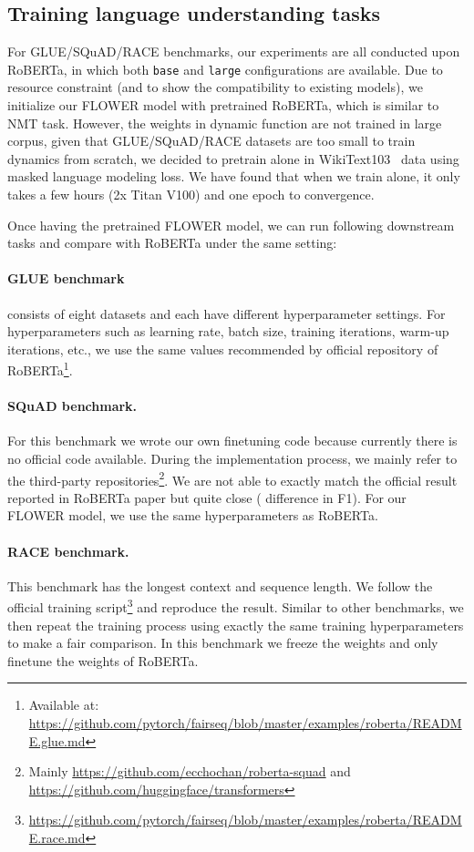 \documentclass[11pt]{article}
\begin{document}
\subsection{Training language understanding tasks}
For GLUE/SQuAD/RACE benchmarks, our experiments are all conducted upon RoBERTa, in which both \texttt{base} and \texttt{large} configurations are available. Due to resource constraint (and to show the compatibility to existing models), we initialize our FLOWER model with pretrained RoBERTa, which is similar to NMT task. However, the weights  in dynamic function  are not trained in large corpus, given that GLUE/SQuAD/RACE datasets are too small to train dynamics from scratch, we decided to pretrain  alone in WikiText103~\cite{merity2016pointer} data using masked language modeling loss. We have found that when we train  alone, it only takes a few hours (2x Titan V100) and one epoch to convergence. 
\par
Once having the pretrained FLOWER model, we can run following downstream tasks and compare with RoBERTa under the same setting:
\paragraph{GLUE benchmark}consists of eight datasets and each have different hyperparameter settings. For hyperparameters such as learning rate, batch size, training iterations, warm-up iterations, etc., we use the same values recommended by official repository of RoBERTa\footnote{Available at: \url{https://github.com/pytorch/fairseq/blob/master/examples/roberta/README.glue.md}}. 
\paragraph{SQuAD benchmark.} For this benchmark we wrote our own finetuning code because currently there is no official code available. During the implementation process, we mainly refer to the third-party repositories\footnote{ Mainly \url{https://github.com/ecchochan/roberta-squad} and \url{https://github.com/huggingface/transformers}}. We are not able to exactly match the official result reported in RoBERTa paper but quite close ( difference in F1). For our FLOWER model, we use the same hyperparameters as RoBERTa.
\paragraph{RACE benchmark.} This benchmark has the longest context and sequence length. We follow the official training script\footnote{\url{https://github.com/pytorch/fairseq/blob/master/examples/roberta/README.race.md}} and reproduce the result. Similar to other benchmarks, we then repeat the training process using exactly the same training hyperparameters to make a fair comparison. In this benchmark we freeze the weights  and only finetune the weights of RoBERTa.
\end{document}
